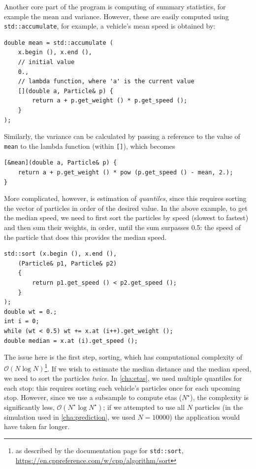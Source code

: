 Another core part of the program is computing of summary statistics, for example the mean and variance. However, these are easily computed using \verb+std::accumulate+, for example, a vehicle's mean speed is obtained by:
\begin{lstlisting}
double mean = std::accumulate (
    x.begin (), x.end (),
    // initial value
    0.,
    // lambda function, where 'a' is the current value
    [](double a, Particle& p) {
        return a + p.get_weight () * p.get_speed ();
    }
);
\end{lstlisting}
Similarly, the variance can be calculated by passing a reference to the value of {\tt mean} to the lambda function (within {\tt []}), which becomes
\begin{lstlisting}
[&mean](double a, Particle& p) {
    return a + p.get_weight () * pow (p.get_speed () - mean, 2.);
}
\end{lstlisting}

More complicated, however, is estimation of \emph{quantiles}, since this requires sorting the vector of particles in order of the desired value. In the above example, to get the median speed, we need to first sort the particles by speed (slowest to fastest) and then sum their weights, in order, until the sum surpasses 0.5: the speed of the particle that does this provides the median speed.
\begin{lstlisting}
std::sort (x.begin (), x.end (),
    (Particle& p1, Particle& p2)
    {
        return p1.get_speed () < p2.get_speed ();
    }
);
double wt = 0.;
int i = 0;
while (wt < 0.5) wt += x.at (i++).get_weight ();
double median = x.at (i).get_speed ();
\end{lstlisting}

The issue here is the first step, sorting, which has computational complexity of $\mathcal{O}(N\log N)$\footnote{as described by the documentation page for \verb+std::sort+, \url{https://en.cppreference.com/w/cpp/algorithm/sort}}. If we wish to estimate the median distance and the median speed, we need to sort the particles \emph{twice}. In \cref{cha:etas}, we used multiple quantiles for each stop: this requires sorting each vehicle's particles once for each upcoming stop. However, since we use a subsample to compute \glspl{eta} ($N^\star$), the complexity is significantly less, $\mathcal{O}(N^\star\log N^\star)$; if we attempted to use all $N$ particles (in the simulation used in \cref{cha:prediction}, we used $N=10000$) the application would have taken far longer.



